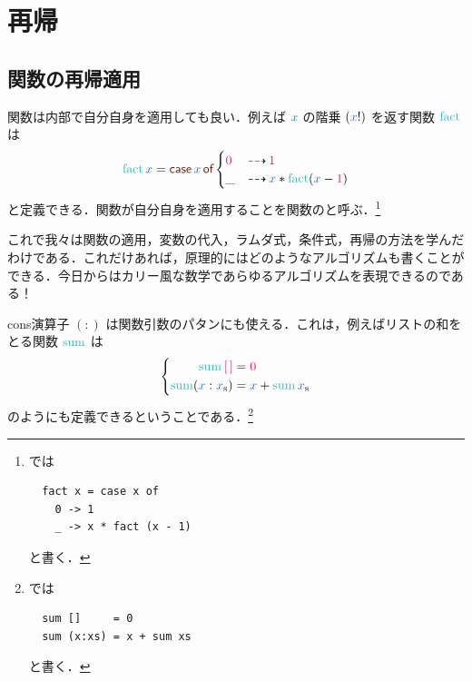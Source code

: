 \documentclass[a5paper,twoside,fleqn,draft]{jsbook}
\begin{document}

\chapter{再帰}
\label{ch:recursion}

\begin{leader}
\end{leader}

\section{関数の再帰適用}

関数は内部で自分自身を適用しても良い．例えば $\hVar{x}$ の階乗 $(\hVar{x}!)$ を返す関数 $\mFact$ は
\begin{equation}
  \mFact\hVar{x}
  =\hCaseSyntax{\hVar{x}}
  \begin{cases}
    \hConstant{0}
    &\hIfSo\hConstant{1}\\
    \_
    &\hIfSo\hVar{x}*\mFact(\hVar{x}-\hConstant{1})
  \end{cases}
\end{equation}
と定義できる．関数が自分自身を適用することを関数のと呼ぶ．\footnote{\haskell では
\begin{verbatim}
  fact x = case x of
    0 -> 1
    _ -> x * fact (x - 1)
\end{verbatim}
と書く．}

これで我々は関数の適用，変数の代入，ラムダ式，条件式，再帰の方法を学んだわけである．これだけあれば，原理的にはどのようなアルゴリズムも書くことができる．今日からはカリー風な数学であらゆるアルゴリズムを表現できるのである！

\separator

cons演算子 $(:)$ は関数引数のパタンにも使える．これは，例えばリストの和をとる関数 $\hSum$ は
\begin{equation}
  \left\{
  \begin{aligned}
    \hSum\mEmptyList
    &=\hConstant{0}\\
    \hSum(\hVar{x}:\hListVar{x})
    &=\hVar{x}+\hSum\hListVar{x}
  \end{aligned}
  \right.
\end{equation}
のようにも定義できるということである．\footnote{\haskell では
\begin{verbatim}
  sum []     = 0
  sum (x:xs) = x + sum xs
\end{verbatim}
と書く．}
\end{document}
